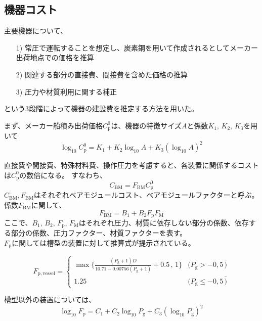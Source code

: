 \documentclass[a4j]{jsreport}
\begin{document}
\subsection*{機器コスト}
主要機器について、
\begin{itemize}
    \item[1)]常圧で運転することを想定し、炭素鋼を用いて作成されるとしてメーカー出荷地点での価格を推算
    \item[2)]関連する部分の直接費、間接費を含めた価格の推算
    \item[3)]圧力や材質利用に関する補正  
\end{itemize}
という3段階によって機器の建設費を推定する方法を用いた。
\par
まず、メーカー船積み出荷価格$C_\mathrm{p}^0$は、機器の特徴サイズ$A$と係数$K_1,\,K_2,\,K_3$を用いて
\begin{equation}\nonumber
    \log_{10}C_\mathrm{p}^0 = K_1 + K_2\log_{10} A + K_3(\log_{10} A)^2
\end{equation}
\par
直接費や間接費、特殊材料費、操作圧力を考慮すると、各装置に関係するコストは$C_\mathrm{p}^0$の数倍になる。
すなわち、
\begin{equation}\nonumber
    C_\mathrm{BM} = F_\mathrm{BM} C_\mathrm{p}^0
\end{equation}
$C_\mathrm{BM}$,\,$ F_\mathrm{BM}$はそれぞれベアモジュールコスト、ベアモジュールファクターと呼ぶ。
係数$F_\mathrm{BM}$に関して、
\begin{equation}\nonumber
    F_\mathrm{BM} = B_1 + B_2 F_\mathrm{p} F_\mathrm{M}
\end{equation}
ここで、$B_1,\, B_2 ,\,F_\mathrm{p},\, F_\mathrm{M}$はそれぞれ圧力、材質に依存しない部分の係数、依存する部分の係数、圧力ファクター、材質ファクターを表す。\\
$F_\mathrm{p}$に関しては槽型の装置に対して推算式が提示されている。\\
\begin{center}
\begin{equation}\nonumber
    F_\mathrm{p,vessel} = 
        \begin{cases}
            \max\{\frac{(P_\mathrm{g}+1)D}{10.71-0.00756(P_\mathrm{g}+1)}+0.5 \,,\, 1\} & (P_\mathrm{g} > -0,5\, \bar) \\
            1.25 & (P_\mathrm{g} \leq -0,5\, \bar)
        \end{cases}
\end{equation}
\end{center}
槽型以外の装置については、
\begin{equation}\nonumber
    \log_{10}F_\mathrm{p} = C_1 + C_2\log_{10} P_\mathrm{g} + C_3(\log_{10} P_\mathrm{g})^2
\end{equation}
\end{document}

